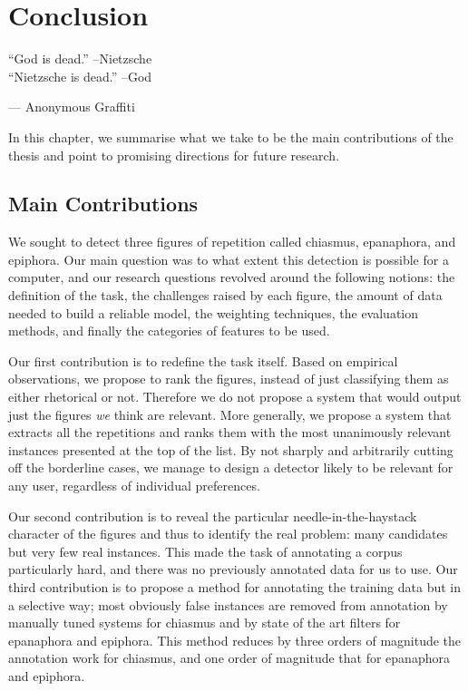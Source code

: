 \chapter{\label{conclu}Conclusion}%
\epigraph{``God is dead.''
--Nietzsche\\
``Nietzsche is dead.''
--God}{--- Anonymous Graffiti}
\noindent
In this chapter, we summarise what we take to be the main contributions of the thesis and point to promising directions for future research.

\section{Main Contributions}
 We sought to detect three figures of repetition called chiasmus, epanaphora, and epiphora. Our main question was to what extent this detection is possible for a computer, and our %
research questions revolved around the following notions: the definition of the task, the challenges raised by each figure, the amount of data needed to build a reliable model, the weighting techniques, the evaluation methods, and finally the categories of features to be used.
%


Our first contribution is to redefine the task itself. Based on empirical observations, we propose to rank the figures, instead of just classifying them as either rhetorical or not. Therefore we do not propose a system that would output just the figures \textit{we} think are relevant. More generally, we propose a system that extracts all the repetitions and ranks them with the most unanimously relevant instances presented at the top of the list. By not sharply and arbitrarily cutting off the borderline cases, we manage to design a detector likely to be relevant for any user, regardless of individual preferences.

Our second contribution is to reveal the particular needle-in-the-haystack character of the figures and thus to identify the real problem: many candidates but very few real instances. This made the task of annotating a corpus particularly hard, and there was no previously annotated data for us to use. Our third contribution is to propose a method for annotating the training data but in a selective way; most obviously false instances are removed from annotation by manually tuned systems for chiasmus and by state of the art filters for epanaphora and epiphora. This method reduces by three orders of magnitude the annotation work for chiasmus, and one order of magnitude that for epanaphora and epiphora. 


